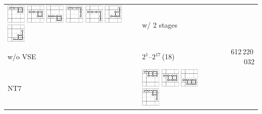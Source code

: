 \documentclass[runningheads]{llncs}
\begin{document}
\begin{tabular}{ll@{~~}r}
\includegraphics[width=0.9cm]{figures/NTuple-62.pdf}
\includegraphics[width=0.9cm]{figures/NTuple-63.pdf}
\includegraphics[width=0.9cm]{figures/NTuple-64.pdf}
\includegraphics[width=0.9cm]{figures/NTuple-65.pdf}
\includegraphics[width=0.9cm]{figures/NTuple-66.pdf}
\includegraphics[width=0.9cm]{figures/NTuple-67.pdf}
\includegraphics[width=0.9cm]{figures/NTuple-68.pdf}
& w/ 2 stages \\
w/o VSE & \phantom{\rule{1pt}{9.5pt}} $2^1$--$2^{17}$\,(18) & 612\,220\,032 \\\hline
\textsf{NT7}
&
\includegraphics[width=0.9cm]{figures/NTuple-70.pdf}
\includegraphics[width=0.9cm]{figures/NTuple-71.pdf}
\includegraphics[width=0.9cm]{figures/NTuple-72.pdf}
\includegraphics[width=0.9cm]{figures/NTuple-73.pdf}

\end{tabular}
\end{document}
